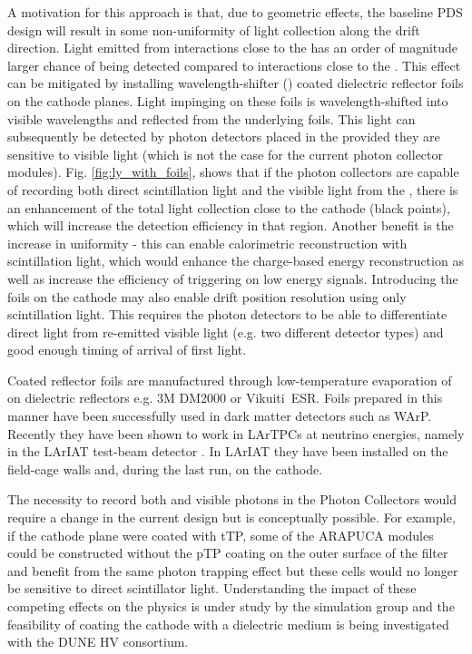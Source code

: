 A motivation for this approach is that, due to geometric effects, the baseline PDS design will result in some non-uniformity of light collection along the drift direction. Light emitted from interactions close to the  has an order of magnitude larger chance of being detected compared to interactions close to the . This effect can be mitigated by installing wavelength-shifter () coated dielectric reflector foils on the cathode planes.
Light impinging on these foils is wavelength-shifted into visible wavelengths and reflected from the underlying foils. This light can subsequently be detected by photon detectors placed in the  provided they are sensitive to visible light (which is not the case for the current photon collector modules). Fig. \ref{fig:ly_with_foils}, shows that if the  photon collectors are capable of recording both direct scintillation light and the visible light from the , there is an enhancement of the total light collection close to the cathode (black points), which will increase the detection efficiency in that region. 
Another benefit is the increase in uniformity - this can enable calorimetric reconstruction with scintillation light, which would enhance the charge-based energy reconstruction as well as increase the efficiency of triggering on low energy signals. Introducing the foils on the cathode may also enable drift position resolution  using only scintillation light. This requires the photon detectors to be able to differentiate direct  light from re-emitted visible light (e.g. two different  detector types) and good enough timing of arrival of first light.

Coated reflector foils are manufactured through low-temperature evaporation of  on dielectric reflectors e.g. 3M DM2000 or Vikuiti\texttrademark\  ESR. Foils prepared in this manner have been successfully used in dark matter detectors such as WArP\cite{Acciarri:2008kv}. Recently they have been shown to work in LArTPCs at neutrino energies, namely  in the LArIAT test-beam detector \cite{Garcia-Gamez:2017cmu}. In LArIAT they have been installed on the field-cage walls and, during the last run, on the cathode.  

The necessity to record both  and visible photons in the Photon Collectors would require a change in the current design but is conceptually possible. For example, if the cathode plane were coated with tTP,  some of the ARAPUCA modules could be constructed without the pTP coating on the outer surface of the filter and benefit from the same photon trapping effect but these cells would no longer be sensitive to direct scintillator light.   
Understanding the impact of these competing effects on the physics is under study by the simulation group and the feasibility of coating the cathode with a dielectric medium is being investigated with the DUNE HV consortium.

